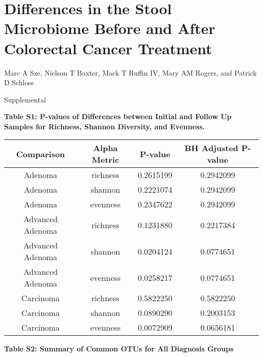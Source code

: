 \documentclass[12pt,]{article}
\title{}
\author{}
\date{}
\begin{document}
\section{Differences in the Stool Microbiome Before and After Colorectal
Cancer
Treatment}\label{differences-in-the-stool-microbiome-before-and-after-colorectal-cancer-treatment}

\vspace{10mm}

\begin{center}
Marc A Sze, Nielson T Baxter, Mack T Ruffin IV, Mary AM Rogers, and Patrick D Schloss

\vspace{10mm}

Supplemental
\end{center}

\newpage

\textbf{Table S1: P-values of Differences between Initial and Follow Up
Samples for Richness, Shannon Diversity, and Evenness.}

\begin{longtable}[]{@{}cccc@{}}
\toprule
Comparison & Alpha Metric & P-value & BH Adjusted P-value\tabularnewline
\midrule
\endhead
Adenoma & richness & 0.2615199 & 0.2942099\tabularnewline
Adenoma & shannon & 0.2221074 & 0.2942099\tabularnewline
Adenoma & evenness & 0.2347622 & 0.2942099\tabularnewline
Advanced Adenoma & richness & 0.1231880 & 0.2217384\tabularnewline
Advanced Adenoma & shannon & 0.0204124 & 0.0774651\tabularnewline
Advanced Adenoma & evenness & 0.0258217 & 0.0774651\tabularnewline
Carcinoma & richness & 0.5822250 & 0.5822250\tabularnewline
Carcinoma & shannon & 0.0890290 & 0.2003153\tabularnewline
Carcinoma & evenness & 0.0072909 & 0.0656181\tabularnewline
\bottomrule
\end{longtable}

\newpage

\newcommand{\blandscape}{\begin{landscape}}
\newcommand{\elandscape}{\end{landscape}}

\textbf{Table S2: Summary of Common OTUs for All Diagnosis Groups}

\footnotesize
\end{document}
